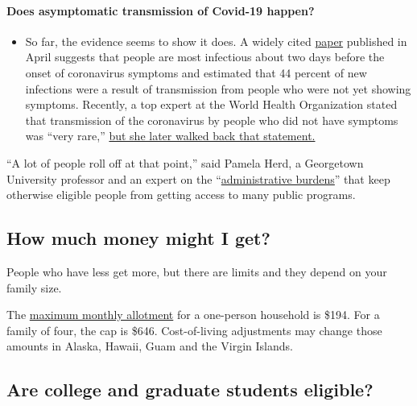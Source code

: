 \begin{itemize}
{  \paragraph{Does asymptomatic transmission of Covid-19
  happen?}\label{does-asymptomatic-transmission-of-covid-19-happen}}

  \begin{itemize}
  \tightlist
  \item
    So far, the evidence seems to show it does. A widely cited
    \href{https://www.nature.com/articles/s41591-020-0869-5}{paper}
    published in April suggests that people are most infectious about
    two days before the onset of coronavirus symptoms and estimated that
    44 percent of new infections were a result of transmission from
    people who were not yet showing symptoms. Recently, a top expert at
    the World Health Organization stated that transmission of the
    coronavirus by people who did not have symptoms was ``very rare,''
    \href{https://www.nytimes3xbfgragh.onion/2020/06/09/world/coronavirus-updates.html?action=click\&pgtype=Article\&state=default\&region=MAIN_CONTENT_3\&context=storylines_faq\#link-1f302e21}{but
    she later walked back that statement.}
  \end{itemize}
\end{itemize}

``A lot of people roll off at that point,'' said Pamela Herd, a
Georgetown University professor and an expert on the
``\href{https://www.russellsage.org/publications/administrative-burden}{administrative
burdens}'' that keep otherwise eligible people from getting access to
many public programs.

\hypertarget{how-much-money-might-i-get}{%
\subsection{How much money might I
get?}\label{how-much-money-might-i-get}}

People who have less get more, but there are limits and they depend on
your family size.

The \href{https://www.fns.usda.gov/snap/recipient/eligibility}{maximum
monthly allotment} for a one-person household is \$194. For a family of
four, the cap is \$646. Cost-of-living adjustments may change those
amounts in Alaska, Hawaii, Guam and the Virgin Islands.

\hypertarget{are-college-and-graduate-students-eligible}{%
\subsection{Are college and graduate students
eligible?}\label{are-college-and-graduate-students-eligible}}

